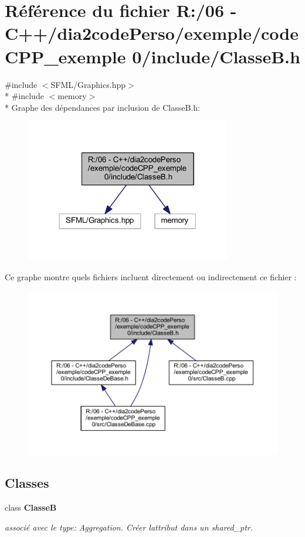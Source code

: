 \section{Référence du fichier R\+:/06 -\/ C++/dia2code\+Perso/exemple/code\+C\+P\+P\+\_\+exemple 0/include/\+Classe\+B.h}
\label{_classe_b_8h}
{\ttfamily \#include $<$S\+F\+M\+L/\+Graphics.\+hpp$>$}\\*
{\ttfamily \#include $<$memory$>$}\\*
Graphe des dépendances par inclusion de Classe\+B.\+h\+:
\nopagebreak
\begin{figure}[H]
\begin{center}
\leavevmode
\includegraphics[width=254pt]{_classe_b_8h__incl}
\end{center}
\end{figure}
Ce graphe montre quels fichiers incluent directement ou indirectement ce fichier \+:
\nopagebreak
\begin{figure}[H]
\begin{center}
\leavevmode
\includegraphics[width=350pt]{_classe_b_8h__dep__incl}
\end{center}
\end{figure}
\subsection*{Classes}
\begin{DoxyCompactItemize}
\item 
class {\bf Classe\+B}
\begin{DoxyCompactList}\small\item\em associé avec le type\+: \textquotesingle{}Aggregation\textquotesingle{}. Créer l\textquotesingle{}attribut dans un shared\+\_\+ptr. \end{DoxyCompactList}\end{DoxyCompactItemize}
